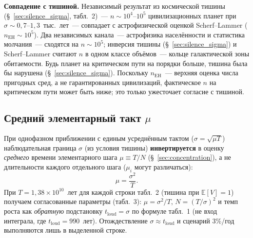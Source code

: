 \documentclass[12pt,a4paper]{article}
\begin{document}
\textbf{Совпадение с тишиной.} Независимый результат из космической тишины (\S~\ref{sec:silence_sigma}, табл.~2)~--- $n \sim 10^4$--$10^5$ цивилизационных планет при $\sigma \sim 0{,}7$--$1{,}3$~тыс.~лет~--- совпадает с астрофизической оценкой Scherf--Lammer ($n_{\text{EH}} \sim 10^5$). Два независимых канала~--- астрофизика населённости и статистика молчания~--- сходятся на $n \sim 10^5$; инверсия тишины (\S~\ref{sec:silence_sigma}) и Scherf--Lammer считают $n$ в одном классе объёмов~--- кольце галактической зоны обитаемости. Будь планет на критическом пути на порядки больше, тишина была бы нарушена (\S~\ref{sec:silence_sigma}). Поскольку $n_{\text{EH}}$~--- верхняя оценка числа пригодных сред, а не гарантированных цивилизаций, фактическое $n$ на критическом пути может быть ниже; это только ужесточает согласие с тишиной.

\subsection{Средний элементарный такт \texorpdfstring{$\mu$}{μ}}
\label{sec:mu_from_sigma}

При однофазном приближении с единым усреднённым тактом ($\sigma = \sqrt{\mu T}$) наблюдательная граница $\sigma$ (из условия тишины) \textbf{инвертируется} в оценку \emph{среднего} времени элементарного шага $\mu \equiv T/N$ (\S~\ref{sec:concentration}), а не длительности каждого отдельного шага ($\mu_i$ могут различаться):
\begin{equation}
\boxed{\mu = \frac{\sigma^2}{T}.}
\end{equation}
При $T = 1{,}38 \times 10^{10}$~лет для каждой строки табл.~2 (тишина при $\mathbb{E}[V]=1$) получаем согласованные параметры (табл.~3): $\mu=\sigma^2/T$, $N=(T/\sigma)^2$ и темп роста как \emph{обратную} подстановку $t_{\mathrm{loud}}=\sigma$ по формуле табл.~1 (не вход интеграла, где $t_{\mathrm{loud}}=990$~лет). Отождествление $\sigma \approx t_{\mathrm{loud}}$ и сценарий $3\%$/год выполняются лишь в выделенной строке.
\end{document}
